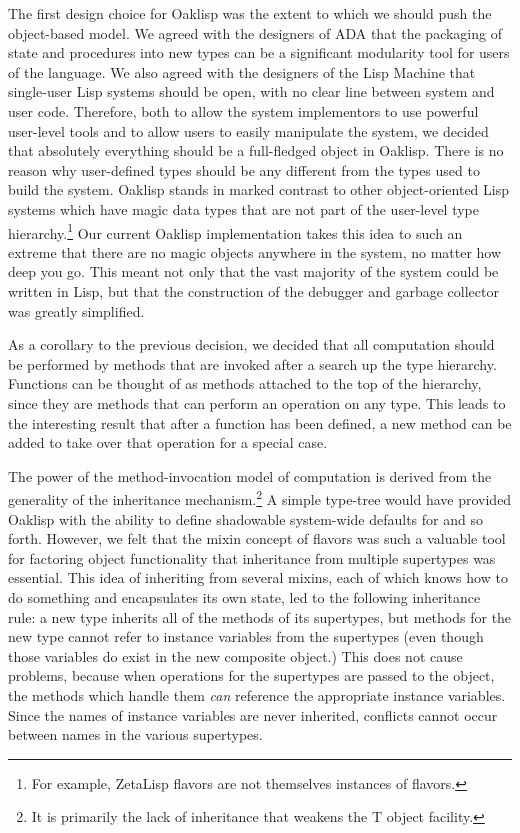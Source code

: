 The first design choice for Oaklisp was the extent to which we should
push the object-based model.  We agreed with the designers of ADA that
the packaging of state and procedures into new types can be a
significant modularity tool for users of the language.  We also agreed
with the designers of the Lisp Machine that single-user Lisp systems
should be open, with no clear line between system and user code.
Therefore, both to allow the system implementors to use powerful
user-level tools and to allow users to easily manipulate the system,
we decided that absolutely everything should be a full-fledged object
in Oaklisp.  There is no reason why user-defined types should be any
different from the types used to build the system.  Oaklisp stands in
marked contrast to other object-oriented Lisp systems which have magic
data types that are not part of the user-level type
hierarchy.\footnote{For example, ZetaLisp flavors are not themselves
instances of flavors.} Our current Oaklisp implementation takes this
idea to such an extreme that there are no magic objects anywhere in
the system, no matter how deep you go.  This meant not only that the
vast majority of the system could be written in Lisp, but that the
construction of the debugger and garbage collector was greatly
simplified.

As a corollary to the previous decision, we decided that all
computation should be performed by methods that are invoked after a
search up the type hierarchy.  Functions can be thought of as methods
attached to the top of the hierarchy, since they are methods that can
perform an operation on any type.  This leads to the interesting
result that after a function has been defined, a new method can be
added to take over that operation for a special case.

The power of the method-invocation model of computation is derived
from the generality of the inheritance mechanism.\footnote{It is
primarily the lack of inheritance that weakens the T object facility.}
A simple type-tree would have provided Oaklisp with the ability to
define shadowable system-wide defaults for  and so forth.
However, we felt that the mixin concept of flavors was such a valuable
tool for factoring object functionality that inheritance from multiple
supertypes was essential.  This idea of inheriting from several
mixins, each of which knows how to do something and encapsulates its
own state, led to the following inheritance rule: a new type inherits
all of the methods of its supertypes, but methods for the new type
cannot refer to instance variables from the supertypes (even though
those variables do exist in the new composite object.) This does not
cause problems, because when operations for the supertypes are passed
to the object, the methods which handle them {\it can} reference the
appropriate instance variables.  Since the names of instance variables
are never inherited, conflicts cannot occur between names in the
various supertypes.

